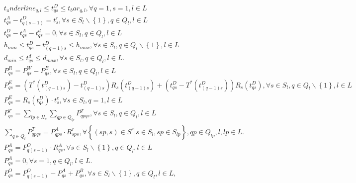 \begin{align}
  & t_underline_{q , l} \leq t_{q s}^{D} \leq t_bar_{q , l} , \forall q = 1 , s = 1 , l \in L \tag{eq\_0001} \\
  & t_{q s}^{A} - t_{q \left(s - 1\right)}^{D} = t_{s}^{r} , \forall s \in S_{l} \backslash \left\{1\right\} , q \in Q_{l} , l \in L \tag{eq\_0002} \\
  & t_{q s}^{D} - t_{q s}^{A} - t_{q s}^{d} = 0 , \forall s \in S_{l} , q \in Q_{l} , l \in L \tag{eq\_0003} \\
  & h_{min} \leq t_{q s}^{D} - t_{\left(q - 1\right) s}^{D} \leq h_{max} , \forall s \in S_{l} , q \in Q_{l} \backslash \left\{1\right\} , l \in L \tag{eq\_0004} \\
  & d_{min} \leq t_{q s}^{d} \leq d_{max} , \forall s \in S_{l} , q \in Q_{l} , l \in L . \tag{eq\_0005} \\
  & P_{q s}^{R} = P_{q s}^{W} - P_{q s}^{B} , \forall s \in S_{l} , q \in Q_{l} , l \in L \tag{eq\_0006} \\
  & P_{q s}^{E} = \left(T^{*} \left(t_{\left(q - 1\right) s}^{D}\right) - t_{\left(q - 1\right) s}^{D}\right) R_{s} \left(t_{\left(q - 1\right) s}^{D}\right) + \left(t_{q s}^{D} - T^{*} \left(t_{\left(q - 1\right) s}^{D}\right)\right) R_{s} \left(t_{q s}^{D}\right) , \forall s \in S_{l} , q \in Q_{l} \backslash \left\{1\right\} , l \in L \tag{eq\_0007} \\
  & P_{q s}^{E} = R_{s} \left(t_{q s}^{D}\right) \cdot t_{s}^{e} , \forall s \in S_{l} , q = 1 , l \in L \tag{eq\_0008} \\
  & P_{q s}^{T} = \sum_{lp \in H_{s}} \underset{qp \in Q_{lp}}{\sum} P_{qp q s}^{T} , \forall s \in S_{l} , q \in Q_{l} , l \in L \tag{eq\_0009} \\
  & \sum_{q \in Q_{l}} P_{qp q s}^{T} = P_{qp s}^{A} \cdot R_{sp s}^{r} , \forall \left\{\right. \left(sp , s\right) \in S^{r} \left|\right. s \in S_{l} , sp \in S_{lp} \left.\right\} , qp \in Q_{lp} , l , lp \in L . \tag{eq\_0010} \\
  & P_{q s}^{A} = P_{q \left(s - 1\right)}^{O} \cdot R_{q s}^{A} , \forall s \in S_{l} \backslash \left\{1\right\} , q \in Q_{l} , l \in L \tag{eq\_0011} \\
  & P_{q s}^{A} = 0 , \forall s = 1 , q \in Q_{l} , l \in L . \tag{eq\_0012} \\
  & P_{q s}^{O} = P_{q \left(s - 1\right)}^{O} - P_{q s}^{A} + P_{q s}^{B} , \forall s \in S_{l} \backslash \left\{1\right\} , q \in Q_{l} , l \in L , \tag{eq\_0013} \\

\end{align}
